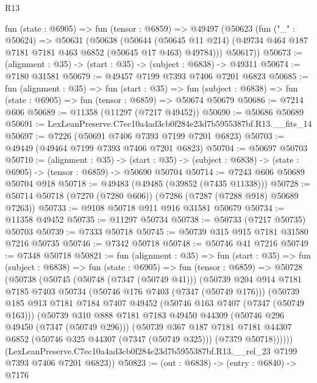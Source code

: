 \begin{lexlean}{R13}
\begin{coremodule}
  fun (state : @6905) =>
  fun (tensor : @6859) =>
  @49497
    (@50623
      (fun ("_" : @50624) =>
      @50631
        (@50638
          (@50644
            (@50645 @11 @214)
            (@49734 @464 @187 @7181 @7181 @463 @6852 (@50645 @17 @463) @49784)))
        @50617))
@50673 := (alignment : @35) -> (start : @35) -> (subject : @6838) -> @49311
@50674 := @7180 @31581
@50679 := @49457 @7199 @7393 @7406 @7201 @6823
@50685 := fun (alignment : @35) =>
  fun (start : @35) =>
  fun (subject : @6838) => fun (state : @6905) => fun (tensor : @6859) => @50674 @50679
@50686 := @7214 @606
@50689 := @11358 (@11297 (@7217 @49452))
@50690 := @50686 @50689
@50691 := LexLeanPreserve.C7ec10a4ad3cb0f284e23d7b5955387bf.R13.__fits_14
@50697 := @7226 (@50691 @7406 @7393 @7199 @7201 @6823)
@50703 := @49449 (@49464 @7199 @7393 @7406 @7201 @6823)
@50704 := @50697 @50703
@50710 := (alignment : @35) ->
  (start : @35) -> (subject : @6838) -> (state : @6905) -> (tensor : @6859) -> @50690 @50704
@50714 := @7243 @606 @50689 @50704 @918
@50718 := @49483 (@49485 (@39852 (@7435 @11338)))
@50728 := @50714 @50718 (@7270 (@7280 @606)) (@7286 (@7287 (@7288 @918) @50689 @7263))
@50733 := @9108 @50718 @911 @916 @31581 @50679
@50734 := @11358 @49452
@50735 := @11297 @50734
@50738 := @50733 (@7217 @50735) @50703
@50739 := @7333 @50718
@50745 := @50739 @315 @915 @7181 @31580 @7216 @50735
@50746 := @7342 @50718
@50748 := @50746 @41 @7216
@50749 := @7348 @50718
@50821 := fun (alignment : @35) =>
  fun (start : @35) =>
  fun (subject : @6838) =>
  fun (state : @6905) =>
  fun (tensor : @6859) =>
  @50728
    (@50738
      (@50745
        (@50748 (@7347 (@50749 @41)))
        (@50739
          @204
          @914
          @7181
          @7185
          @7403
          @50734
          (@50746 @176 @7403 (@7347 (@50749 @176)))
          (@50739
            @185
            @913
            @7181
            @7184
            @7407
            @49452
            (@50746 @163 @7407 (@7347 (@50749 @163)))
            (@50739
              @310
              @888
              @7181
              @7183
              @49450
              @44309
              (@50746 @296 @49450 (@7347 (@50749 @296)))
              (@50739
                @367
                @187
                @7181
                @7181
                @44307
                @6852
                (@50746 @325 @44307 (@7347 (@50749 @325)))
                (@7379 @50718))))))
      (LexLeanPreserve.C7ec10a4ad3cb0f284e23d7b5955387bf.R13.__rel_23
        @7199
        @7393
        @7406
        @7201
        @6823))
@50823 := (out : @6838) -> (entry : @6840) -> @7176

\end{coremodule}
\end{lexlean}
